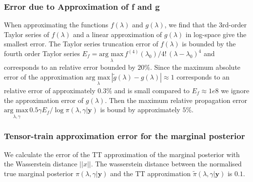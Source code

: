\subsubsection{Error due to Approximation of f and g}
\label{sec:fgErros}
When approximating the functions $f(\lambda)$ and $g(\lambda)$, we find that the 3rd-order Taylor series of $f(\lambda)$ and a linear approximation of $g(\lambda)$ in log-space give the smallest error.
The Taylor series truncation error of $f(\lambda)$ is bounded by the fourth order Taylor series $E_f = \underset{\lambda}{\text{arg max}\,} f^{(4)}(\lambda_0)/ 4! \, (\lambda - \lambda_{0} )^4$ and corresponds to an relative error bounded by $20\%$.
Since the maximum absolute error of the approximation $\underset{\lambda}{\text{arg max}\,}|\tilde{g}(\lambda) - g(\lambda) | \approx 1$ corresponds to an relative error of approximately $0.3\%$ and is small compared to $E_f \approx 1e8$ we ignore the approximation error of $g(\lambda)$.
Then the maximum relative propagation error $\underset{\lambda, \gamma}{\text{arg max}\,} 0.5 \gamma  E_f / \log{\pi{(\lambda ,\gamma | \bm{y})}} $ is bound by approximately $5\%$.
\subsubsection{Tensor-train approximation error for the marginal posterior}
We calculate the error of the TT approximation of the marginal posterior with the Wasserstein distance $||x||$.
The wasserstein distance between the normalised true marginal posterior $\pi(\lambda,\gamma|\bm{y})$ and the TT approximation $\tilde{\pi}(\lambda,\gamma|\bm{y})$ is $0.1$.


